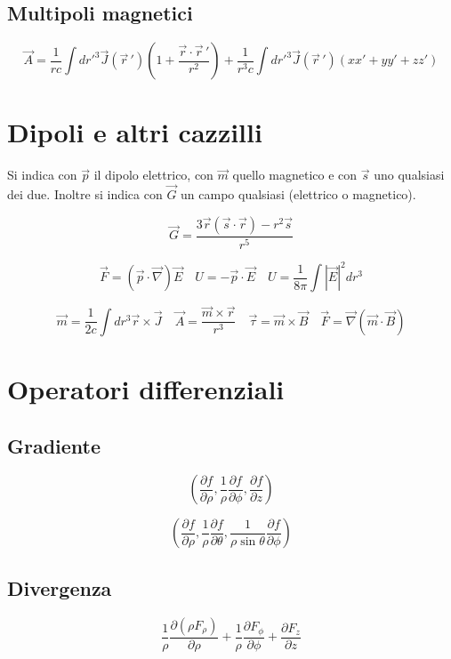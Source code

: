 \documentclass[a4paper, 11pt]{article}
\begin{document}
	\subsection{Multipoli magnetici}
	$$\vec{A} = \frac{1}{rc}\int dr'^3 \vec{J}\left( \vec{r}\,' \right) \left( 1+\frac{\vec{r}\cdot\vec{r}\,'}{r^2} \right) + \frac{1}{r^3 c}\int dr'^3 \vec{J}\left( \vec{r}\,' \right) \left( x x' + y y' + z z' \right) $$

	\section{Dipoli e altri cazzilli}
	\label{dip}
	Si indica con $\vec{p}$ il dipolo elettrico, con $\vec{m}$ quello magnetico e 
	con $\vec{s}$ uno qualsiasi dei due. Inoltre si indica con $\vec{G}$ un campo qualsiasi 
	(elettrico o magnetico).

	$$\vec{G} = \frac{3\vec{r}\left(\vec{s}\cdot\vec{r} \right) - r^2 \vec{s}}{r^5}$$

	$$\vec{F} = \left( \vec{p}\cdot\vec{\nabla} \right) \vec{E} \quad U = -\vec{p}\cdot\vec{E}\quad U=\frac{1}{8\pi}\int|\vec{E} |^2 dr^3$$

	$$\vec{m}=\frac{1}{2c}\int dr^3 \vec{r} \times \vec{J} \quad \vec{A} = \frac{\vec{m} \times \vec{r}}{r^3} \quad \vec{\tau} = \vec{m}\times\vec{B} \quad \vec{F}=\vec{\nabla }\left( \vec{m}\cdot\vec{B} \right) $$

	\section{Operatori differenziali}
	\label{diff}
	\subsection{Gradiente}
	$$\left( \frac{\partial f}{\partial \rho} , \frac{1}{\rho} \frac{\partial f}{\partial \phi} , \frac{\partial f}{\partial z} \right)$$

	$$\left( \frac{\partial f}{\partial \rho} , \frac{1}{\rho}\frac{\partial f}{\partial \theta} , \frac{1}{\rho\sin\theta}\frac{\partial f}{\partial \phi}\right)$$

	\subsection{Divergenza}
	$$\frac{1}{\rho}\frac{\partial \left(\rho F_{\rho}\right)}{\partial \rho} + \frac{1}{\rho}\frac{\partial F_{\phi}}{\partial \phi} + \frac{\partial F_{z}}{\partial z}$$
\end{document}
